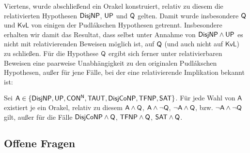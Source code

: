 Viertens, wurde abschließend ein Orakel konstruiert, relativ zu diesem die relativierten Hypothesen $\mathsf{DisjNP}$, $\mathsf{UP}$ und $\mathsf{Q}$ gelten.
Damit wurde insbesondere $\mathsf{Q}$ und $\mathsf{KvL}$ von einigen der Pudlákschen Hypothesen getrennt. Insbesondere erhalten wir damit das Resultat, dass selbst unter Annahme von $\mathsf{DisjNP}\land\mathsf{UP}$ es nicht mit relativierenden Beweisen möglich ist, auf $\mathsf{Q}$ (und auch nicht auf $\mathsf{KvL}$) zu schließen.
Für die Hypothese $\mathsf{Q}$ ergibt sich ferner unter relativierbaren Beweisen eine paarweise Unabhängigkeit zu den originalen Pudlákschen Hypothesen, außer für jene Fälle, bei der eine relativierende Implikation bekannt ist:

\begin{corollary}
    Sei $\mathsf A \in \{\mathsf{DisjNP}, \mathsf{UP}, \mathsf{CON^{N}}, \mathsf{TAUT}, \mathsf{DisjCoNP}, \mathsf{TFNP}, \mathsf{SAT}\}$.
    Für jede Wahl von $\mathsf A$ existiert je ein Orakel, relativ zu diesem $\mathsf A\land \mathsf{Q}$, $\mathsf A\land \neg\mathsf{Q}$, $\neg\mathsf A\land \mathsf{Q}$, bzw. $\neg\mathsf A\land\neg\mathsf{Q}$ gilt, außer für die Fälle $\mathsf{DisjCoNP}\land\mathsf{Q}$, $\mathsf{TFNP}\land\mathsf{Q}$, $\mathsf{SAT}\land\mathsf{Q}$.
\end{corollary}

\subsection*{Offene Fragen}


